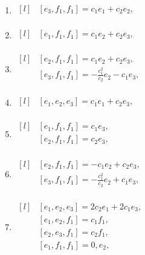 \begin{adjustwidth*}{-0.5cm}{0cm}
\begin{multicols*}{2}
\begin{enumerate}
    \item $\begin{matrix*}[l]
            & [e_3, f_1, f_1] = c_{1} e_1 + c_{2} e_2 , \\
        \end{matrix*}$

    \item $\begin{matrix*}[l]
            & [e_1, f_1, f_1] =  c_{1} e_2 + c_{2} e_3, \\
        \end{matrix*}$

    \item $\begin{matrix*}[l]
            & [e_2, f_1, f_1] =  c_{1} e_2 + c_{2} e_3, \\
            & [e_3, f_1, f_1] =  - \frac{c_{1}^2}{c_{2}} e_2 - c_{1} e_3, \\
        \end{matrix*}$

    \item $\begin{matrix*}[l]
            & [e_1, e_2, e_3] = c_{1} e_1  + c_{2} e_3, \\
        \end{matrix*}$

    \item $\begin{matrix*}[l]
            & [e_1, f_1, f_1] =  c_{1} e_3, \\
            & [e_2, f_1, f_1] =  c_{2} e_3, \\
        \end{matrix*}$

    \item $\begin{matrix*}[l]
            & [e_2, f_1, f_1] =  - c_{1} e_2 + c_{2} e_3, \\
            & [e_3, f_1, f_1] =  - \frac{c_{1}^2}{c_{2}} e_2 + c_{1} e_3, \\
        \end{matrix*}$

    \item $\begin{matrix*}[l]
            & [e_1, e_2, e_3] = 2 c_{2} e_1  + 2 c_{1} e_3, \\
            & [e_1, e_2, f_1] = c_{1} f_1, \\
            & [e_2, e_3, f_1] = c_{2} f_1, \\
            & [e_1, f_1, f_1] =  0, e_2 , \\
        \end{matrix*}$


\end{enumerate}
\end{multicols*}
\end{adjustwidth*}
